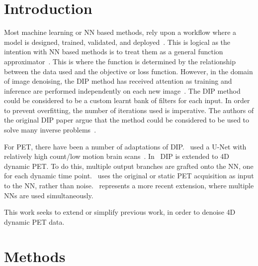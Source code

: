     \section{Introduction} \label{sec:pseudo_bayesian_dip_denoising_as_a_preprocessing_step_for_kinetic_modelling_in_dynamic_pet_appendix_introduction}
        Most machine learning or \gls{NN} based methods, rely upon a workflow where a model is designed, trained, validated, and deployed~\parencite{Krose1993AnNetworks}. This is logical as the intention with \gls{NN} based methods is to treat them as a general function approximator~\parencite{Krose1993AnNetworks}. This is where the function is determined by the relationship between the data used and the objective or loss function. However, in the domain of image denoising, the \gls{DIP} method has received attention as training and inference are performed independently on each new image~\parencite{Ulyanov2020DeepPrior}. The \gls{DIP} method could be considered to be a custom learnt bank of filters for each input. In order to prevent overfitting, the number of iterations used is imperative. The authors of the original \gls{DIP} paper argue that the method could be considered to be used to solve many inverse problems~\parencite{Ulyanov2020DeepPrior}.
        
        For \gls{PET}, there have been a number of adaptations of \gls{DIP}.~\parencite{Gong2019PETPrior} used a U-Net with relatively high count/low motion brain scans~\parencite{Weng2021INet:Segmentation}. In~\parencite{Hashimoto20214DNetwork} \gls{DIP} is extended to \gls{4D} dynamic \gls{PET}. To do this, multiple output branches are grafted onto the \gls{NN}, one for each dynamic time point.~\parencite{Hashimoto2019DynamicDatasets} uses the original or static \gls{PET} acquisition as input to the \gls{NN}, rather than noise.~\parencite{Yang2022SimultaneousPrior} represents a more recent extension, where multiple \glspl{NN} are used simultaneously.
        
        This work seeks to extend or simplify previous work, in order to denoise \gls{4D} dynamic \gls{PET} data.
    
    \section{Methods} \label{sec:pseudo_bayesian_dip_denoising_as_a_preprocessing_step_for_kinetic_modelling_in_dynamic_pet_appendix_methods}
